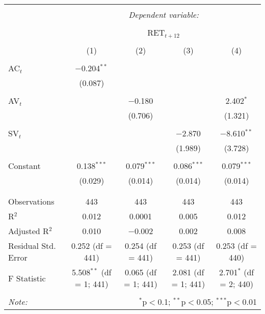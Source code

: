 
\begin{table}[!htbp] \centering 
  \caption{} 
  \label{} 
\begin{tabular}{@{\extracolsep{5pt}}lcccc} 
\\[-1.8ex]\hline 
\hline \\[-1.8ex] 
 & \multicolumn{4}{c}{\textit{Dependent variable:}} \\ 
\cline{2-5} 
\\[-1.8ex] & \multicolumn{4}{c}{RET$_{t+12}$} \\ 
\\[-1.8ex] & (1) & (2) & (3) & (4)\\ 
\hline \\[-1.8ex] 
 AC$_{t}$ & $-$0.204$^{**}$ &  &  &  \\ 
  & (0.087) &  &  &  \\ 
  & & & & \\ 
 AV$_{t}$ &  & $-$0.180 &  & 2.402$^{*}$ \\ 
  &  & (0.706) &  & (1.321) \\ 
  & & & & \\ 
 SV$_{t}$ &  &  & $-$2.870 & $-$8.610$^{**}$ \\ 
  &  &  & (1.989) & (3.728) \\ 
  & & & & \\ 
 Constant & 0.138$^{***}$ & 0.079$^{***}$ & 0.086$^{***}$ & 0.079$^{***}$ \\ 
  & (0.029) & (0.014) & (0.014) & (0.014) \\ 
  & & & & \\ 
\hline \\[-1.8ex] 
Observations & 443 & 443 & 443 & 443 \\ 
R$^{2}$ & 0.012 & 0.0001 & 0.005 & 0.012 \\ 
Adjusted R$^{2}$ & 0.010 & $-$0.002 & 0.002 & 0.008 \\ 
Residual Std. Error & 0.252 (df = 441) & 0.254 (df = 441) & 0.253 (df = 441) & 0.253 (df = 440) \\ 
F Statistic & 5.508$^{**}$ (df = 1; 441) & 0.065 (df = 1; 441) & 2.081 (df = 1; 441) & 2.701$^{*}$ (df = 2; 440) \\ 
\hline 
\hline \\[-1.8ex] 
\textit{Note:}  & \multicolumn{4}{r}{$^{*}$p$<$0.1; $^{**}$p$<$0.05; $^{***}$p$<$0.01} \\ 
\end{tabular} 
\end{table} 
